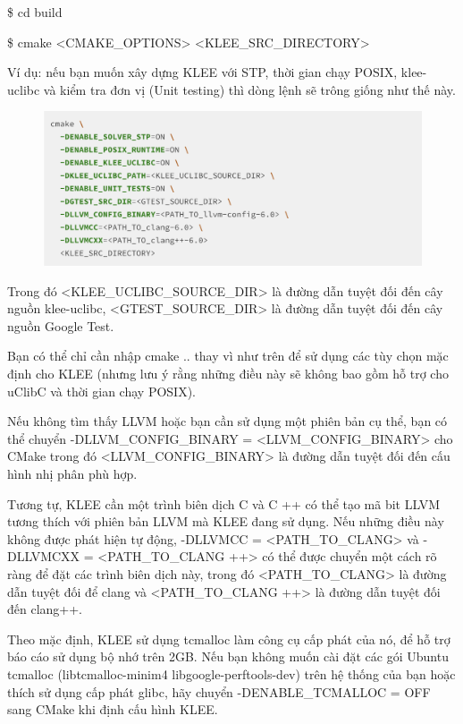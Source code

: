 \documentclass[12pt,a4paper]{article}
\begin{document}
\$ cd build

\$ cmake <CMAKE\_OPTIONS> <KLEE\_SRC\_DIRECTORY>

Ví dụ: nếu bạn muốn xây dựng KLEE với STP, thời gian chạy POSIX, klee-uclibc và kiểm tra đơn vị (Unit testing) thì dòng lệnh sẽ trông giống như thế này.

\begin{figure}[ht]
\begin{center}
\includegraphics[scale=.3]{hinhanh/cmakeklee.png}
\end{center}
\end{figure}

Trong đó <KLEE\_UCLIBC\_SOURCE\_DIR> là đường dẫn tuyệt đối đến cây nguồn klee-uclibc, <GTEST\_SOURCE\_DIR> là đường dẫn tuyệt đối đến cây nguồn Google Test.

Bạn có thể chỉ cần nhập cmake .. thay vì như trên để sử dụng các tùy chọn mặc định cho KLEE (nhưng lưu ý rằng những điều này sẽ không bao gồm hỗ trợ cho uClibC và thời gian chạy POSIX).

Nếu không tìm thấy LLVM hoặc bạn cần sử dụng một phiên bản cụ thể, bạn có thể chuyển -DLLVM\_CONFIG\_BINARY = <LLVM\_CONFIG\_BINARY> cho CMake trong đó <LLVM\_CONFIG\_BINARY> là đường dẫn tuyệt đối đến cấu hình nhị phân phù hợp.

Tương tự, KLEE cần một trình biên dịch C và C ++ có thể tạo mã bit LLVM tương thích với phiên bản LLVM mà KLEE đang sử dụng. Nếu những điều này không được phát hiện tự động, -DLLVMCC = <PATH\_TO\_CLANG> và -DLLVMCXX = <PATH\_TO\_CLANG ++> có thể được chuyển một cách rõ ràng để đặt các trình biên dịch này, trong đó <PATH\_TO\_CLANG> là đường dẫn tuyệt đối để clang và <PATH\_TO\_CLANG ++> là đường dẫn tuyệt đối đến clang++.

Theo mặc định, KLEE sử dụng tcmalloc làm công cụ cấp phát của nó, để hỗ trợ báo cáo sử dụng bộ nhớ trên 2GB. Nếu bạn không muốn cài đặt các gói Ubuntu tcmalloc (libtcmalloc-minim4 libgoogle-perftools-dev) trên hệ thống của bạn hoặc thích sử dụng cấp phát glibc, hãy chuyển -DENABLE\_TCMALLOC = OFF sang CMake khi định cấu hình KLEE.
\end{document}
